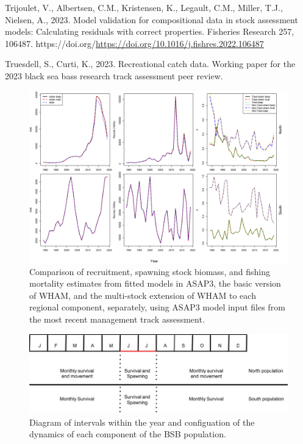 \documentclass[
]{article}
\newlength{\cslhangindent}
\newlength{\cslentryspacingunit} %
\newenvironment{CSLReferences}[2] %
 {%
  \setlength{\parindent}{0pt}
  \ifodd #1
  \let\oldpar\par
  \def\par{\hangindent=\cslhangindent\oldpar}
  \fi
  \setlength{\parskip}{#2\cslentryspacingunit}
 }%
 {}
\newcommand{\blandscape}{\begin{landscape}}
\newcommand{\elandscape}{\end{landscape}}
\begin{document}
\begin{CSLReferences}{1}{0}
\leavevmode{}%
Trijoulet, V., Albertsen, C.M., Kristensen, K., Legault, C.M., Miller, T.J., Nielsen, A., 2023. Model validation for compositional data in stock assessment models: Calculating residuals with correct properties. Fisheries Research 257, 106487. https://doi.org/\url{https://doi.org/10.1016/j.fishres.2022.106487}

\leavevmode{}%
Truesdell, S., Curti, K., 2023. Recreational catch data. Working paper for the 2023 black sea bass research track assessment peer review.

\end{CSLReferences}

\pagebreak

\blandscape
\begin{figure}

{\centering \includegraphics[width=0.75\linewidth]{plots/compare_one_stock_models} 

}

\caption{Comparison of recruitment, spawning stock biomass, and fishing mortality estimates from fitted models in ASAP3, the basic version of WHAM, and the multi-stock extension of WHAM to each regional component, separately, using ASAP3 model input files from the most recent management track assessment.}\label{fig:compare-asap-wham}
\end{figure}

\begin{figure}

{\centering \includegraphics[width=0.8\linewidth]{plots/migration_diagram_1} 

}

\caption{Diagram of intervals within the year and configuation of the dynamics of each component of the BSB population.}\label{fig:unnamed-chunk-2}
\end{figure}
\elandscape
\end{document}
